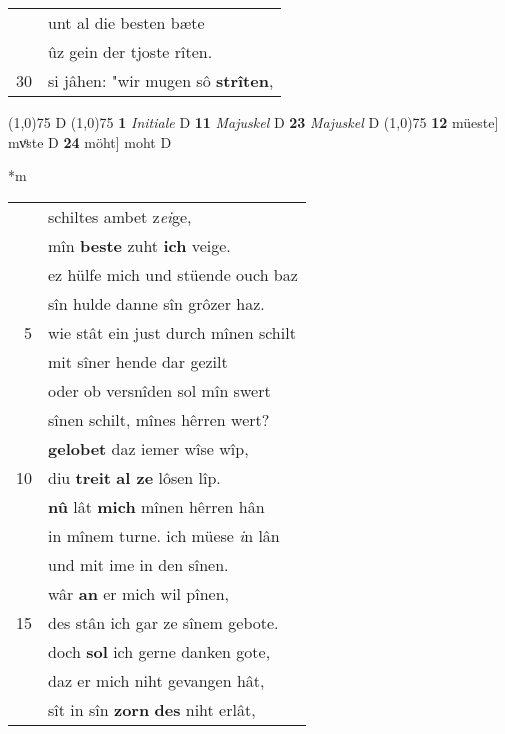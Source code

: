\documentclass[8pt,a4paper,notitlepage]{article}
\begin{document}
\begin{table}[ht]
\begin{minipage}[t]{0.5\linewidth}
\begin{tabular}{rl}
 & unt al die besten bæte\\ 
 & ûz gein der tjoste rîten.\\ 
30 & si jâhen: "wir mugen sô \textbf{strîten},\\ 
\end{tabular}
\scriptsize
\line(1,0){75} \newline
D \newline
\line(1,0){75} \newline
\textbf{1} \textit{Initiale} D  \textbf{11} \textit{Majuskel} D  \textbf{23} \textit{Majuskel} D  \newline
\line(1,0){75} \newline
\textbf{12} müeste] mvͦste D \textbf{24} möht] moht D \newline
\end{minipage}
\hspace{0.5cm}
\begin{minipage}[t]{0.5\linewidth}
\small
\begin{center}*m
\end{center}
\begin{tabular}{rl}
 & schiltes ambet z\textit{ei}ge,\\ 
 & mîn \textbf{beste} zuht \textbf{ich} veige.\\ 
 & ez hülfe mich und stüende ouch baz\\ 
 & sîn hulde danne sîn grôzer haz.\\ 
5 & wie stât ein just durch mînen schilt\\ 
 & mit sîner hende dar gezilt\\ 
 & oder ob versnîden sol mîn swert\\ 
 & sînen schilt, mînes hêrren wert?\\ 
 & \textbf{gelobet} daz iemer wîse wîp,\\ 
10 & diu \textbf{treit} \textbf{al ze} lôsen lîp.\\ 
 & \textbf{nû} lât \textbf{mich} mînen hêrren hân\\ 
 & in mînem turne. ich müese \textit{i}n lân\\ 
 & und mit ime in den sînen.\\ 
 & wâr \textbf{an} er mich wil pînen,\\ 
15 & des stân ich gar ze sînem gebote.\\ 
 & doch \textbf{sol} ich gerne danken gote,\\ 
 & daz er mich niht gevangen hât,\\ 
 & sît in sîn \textbf{zorn} \textbf{des} niht erlât,\\ 

\end{tabular}
\end{minipage}
\end{table}
\end{document}
